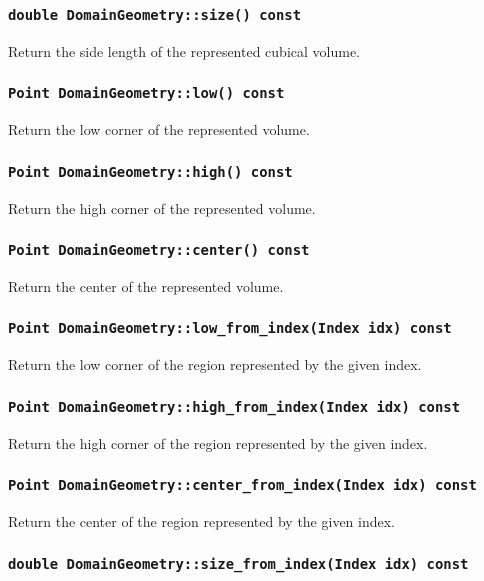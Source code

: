 \subsubsection{\texttt{double DomainGeometry::size() const}}

Return the side length of the represented cubical volume.

\subsubsection{\texttt{Point DomainGeometry::low() const}}

Return the low corner of the represented volume.

\subsubsection{\texttt{Point DomainGeometry::high() const}}

Return the high corner of the represented volume.

\subsubsection{\texttt{Point DomainGeometry::center() const}}

Return the center of the represented volume.

\subsubsection{\texttt{Point DomainGeometry::low\_from\_index(Index idx) const}}

Return the low corner of the region represented by the given index.

\subsubsection{\texttt{Point DomainGeometry::high\_from\_index(Index idx) const}}

Return the high corner of the region represented by the given index.

\subsubsection{\texttt{Point DomainGeometry::center\_from\_index(Index idx) const}}

Return the center of the region represented by the given index.

\subsubsection{\texttt{double DomainGeometry::size\_from\_index(Index idx) const}}

